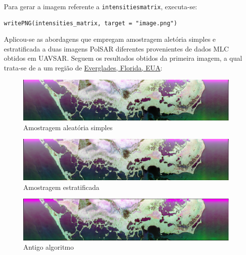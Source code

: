\documentclass[12pt]{article}
\begin{document}
Para gerar a imagem referente a \texttt{intensities}\textunderscore\texttt{matrix}, executa-se:

\begin{verbatim}
writePNG(intensities_matrix, target = "image.png")
\end{verbatim}

Aplicou-se as abordagens que empregam amostragem aletória simples e estratificada a duas imagens PolSAR diferentes provenientes de dados MLC obtidos em UAVSAR. Seguem os resultados obtidos da primeira imagem, a qual trata-se de a um região de \href{https://uavsar.jpl.nasa.gov/cgi-bin/product.pl?jobName=evergl_26301_10053_003_100622_L090_CX_01#data}{Everglades, Florida, EUA}:\\

\begin{figure}[!ht]
	\begin{center}
		\includegraphics[width = 150mm, scale = 0.5]{../../Images/Report_08_18/florida_simple_random_sample_reduced} \\ 
        Amostragem aleatória simples\\
	\end{center}
\end{figure}

\newpage

\begin{figure}[!ht]
	\begin{center}
		\includegraphics[width = 150mm, scale = 0.5]{../../Images/Report_08_18/florida_stratified_sample_reduced} \\ 
        Amostragem estratificada\\
	\end{center}
\end{figure}

\begin{figure}[!ht]
	\begin{center}    
		\includegraphics[width = 150mm, scale = 0.5]{../../Images/Report_08_18/florida_trad_algorithm} \\ 
        Antigo algoritmo\\
	\end{center}
\end{figure}
\end{document}
